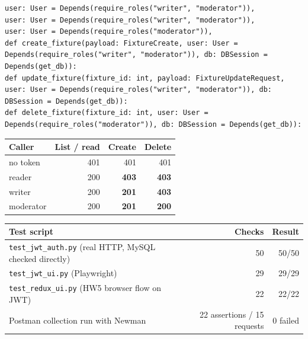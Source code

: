 \documentclass[11pt]{article}
\begin{document}
\begingroup\lstset{basicstyle=\ttfamily\scriptsize}
\begin{lstlisting}
user: User = Depends(require_roles("writer", "moderator")),
user: User = Depends(require_roles("writer", "moderator")),
user: User = Depends(require_roles("moderator")),
def create_fixture(payload: FixtureCreate, user: User = Depends(require_roles("writer", "moderator")), db: DBSession = Depends(get_db)):
def update_fixture(fixture_id: int, payload: FixtureUpdateRequest, user: User = Depends(require_roles("writer", "moderator")), db: DBSession = Depends(get_db)):
def delete_fixture(fixture_id: int, user: User = Depends(require_roles("moderator")), db: DBSession = Depends(get_db)):
\end{lstlisting}
\endgroup
\begin{center}
{\small
\begin{tabular}{lrrr}
\toprule
\textbf{Caller} & \textbf{List / read} & \textbf{Create} & \textbf{Delete} \\
\midrule
no token & 401 & 401 & 401 \\
reader & 200 & \textbf{403} & \textbf{403} \\
writer & 200 & \textbf{201} & \textbf{403} \\
moderator & 200 & \textbf{201} & \textbf{200} \\
\bottomrule
\end{tabular}}
\end{center}
\begin{center}
{\small
\begin{tabular}{lrr}
\toprule
\textbf{Test script} & \textbf{Checks} & \textbf{Result} \\
\midrule
\texttt{test\_\allowbreak{}jwt\_\allowbreak{}auth.py} (real HTTP, MySQL checked directly) & 50 & 50/50 \\
\texttt{test\_\allowbreak{}jwt\_\allowbreak{}ui.py} (Playwright) & 29 & 29/29 \\
\texttt{test\_\allowbreak{}redux\_\allowbreak{}ui.py} (HW5 browser flow on JWT) & 22 & 22/22 \\
Postman collection run with Newman & 22 assertions / 15 requests & 0 failed \\
\bottomrule
\end{tabular}}
\end{center}
\end{document}
